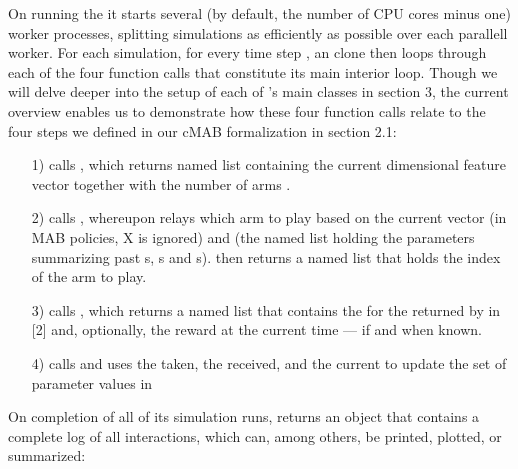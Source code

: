 \documentclass{jss}\usepackage[]{graphicx}\usepackage[]{color}
\begin{document}
On running the  it starts several (by default, the number of CPU cores minus one) worker processes, splitting simulations as efficiently as possible over each parallell worker. For each simulation, for every time step , an  clone then loops through each of the four function calls that constitute its main interior loop. Though we will delve deeper into the setup of each of 's main classes in section 3, the current overview enables us to demonstrate how these four function calls relate to the four steps we defined in our cMAB formalization in section 2.1:

\begin{enumerate}
         \item[1)]  calls , which returns named list  containing the current  dimensional  feature vector  together with the number of arms .
         \item[2)]  calls , whereupon  relays which arm to play based on the current  vector  (in MAB policies, X is ignored) and  (the named list holding the parameters summarizing past s, s and s).  then returns a named list  that holds the index of the arm to play.
         \item[3)]  calls , which returns a named list  that contains the  for the  returned by  in [2] and, optionally, the  reward at the current time  --- if and when known.
         \item[4)]  calls  and uses the  taken, the  received, and the current  to update the set of parameter values in 
\end{enumerate}

On completion of all of its simulation runs,  returns an  object that contains a complete log of all interactions, which can, among others, be printed, plotted, or summarized:
\end{document}
